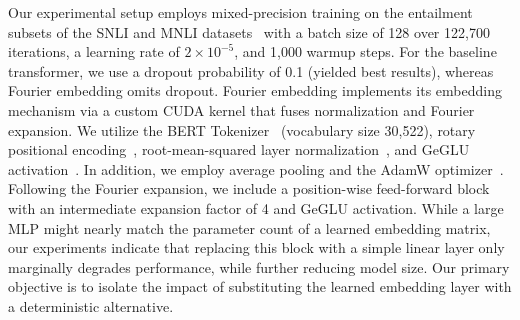 \documentclass{article}
\begin{document}
Our experimental setup employs mixed-precision training on the entailment subsets of the SNLI and MNLI datasets~\cite{snli,mnli} with a batch size of 128 over 122,700 iterations, a learning rate of \(2\times10^{-5}\), and 1,000 warmup steps. For the baseline transformer, we use a dropout probability of 0.1 (yielded best results), whereas Fourier embedding omits dropout. Fourier embedding implements its embedding mechanism via a custom CUDA kernel that fuses normalization and Fourier expansion. We utilize the BERT Tokenizer~\cite{devlin2019bert} (vocabulary size 30,522), rotary positional encoding~\cite{su2021rotary}, root-mean-squared layer normalization~\cite{liu2020rmsnorm}, and GeGLU activation~\cite{shazeer2020glu}. In addition, we employ average pooling and the AdamW optimizer~\cite{loshchilov2019decoupled}. Following the Fourier expansion, we include a position-wise feed-forward block with an intermediate expansion factor of 4 and GeGLU activation. While a large MLP might nearly match the parameter count of a learned embedding matrix, our experiments indicate that replacing this block with a simple linear layer only marginally degrades performance, while further reducing model size. Our primary objective is to isolate the impact of substituting the learned embedding layer with a deterministic alternative.
\end{document}
